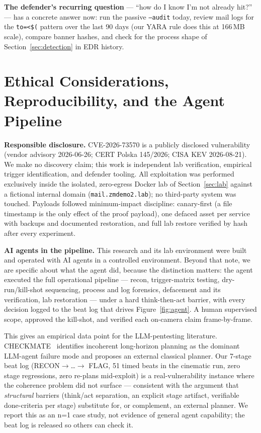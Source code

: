\documentclass[journal]{IEEEtran}
\begin{document}
\textbf{The defender's recurring question} — ``how do I know I'm not
already hit?'' — has a concrete answer now: run the passive
\texttt{--audit} today, review mail logs for the \texttt{to=<\$(} pattern
over the last 90 days (our YARA rule does this at 166\,MB scale), compare
banner hashes, and check for the process shape of
Section~\ref{sec:detection} in EDR history.

\section{Ethical Considerations, Reproducibility, and the Agent Pipeline}
\label{sec:ethics}

\textbf{Responsible disclosure.} CVE-2026-73570 is a publicly disclosed
vulnerability (vendor advisory 2026-06-26; CERT Polska 145/2026; CISA KEV
2026-08-21). We make no discovery claim; this work is independent lab
verification, empirical trigger identification, and defender tooling. All
exploitation was performed exclusively inside the isolated, zero-egress
Docker lab of Section~\ref{sec:lab} against a fictional internal domain
(\texttt{mail.zmdemo2.lab}); no third-party system was touched. Payloads
followed minimum-impact discipline: canary-first (a file timestamp is the
only effect of the proof payload), one defaced asset per service with
backups and documented restoration, and full lab restore verified by hash
after every experiment.

\textbf{AI agents in the pipeline.} This research and its lab environment
were built and operated with AI agents in a controlled environment.
Beyond that note, we are specific about what the agent did, because the
distinction matters: the agent executed the full operational pipeline —
recon, trigger-matrix testing, dry-run/kill-shot sequencing, process and
log forensics, defacement and its verification, lab restoration — under a
hard think-then-act barrier, with every decision logged to the beat log
that drives Figure~\ref{fig:agent}. A human supervised scope, approved the
kill-shot, and verified each on-camera claim frame-by-frame.

This gives an empirical data point for the LLM-pentesting literature.
CHECKMATE~\cite{wang2025checkmate} identifies incoherent long-horizon
planning as the dominant LLM-agent failure mode and proposes an external
classical planner. Our 7-stage beat log (RECON$\rightarrow$\dots$\rightarrow$
FLAG, 51 timed beats in the cinematic run, zero stage regressions, zero
re-plans mid-exploit) is a real-vulnerability instance where the coherence
problem did not surface — consistent with the argument that
\emph{structural} barriers (think/act separation, an explicit stage
artifact, verifiable done-criteria per stage) substitute for, or complement,
an external planner. We report this as an n=1 case study, not evidence of
general agent capability; the beat log is released so others can check it.
\end{document}
